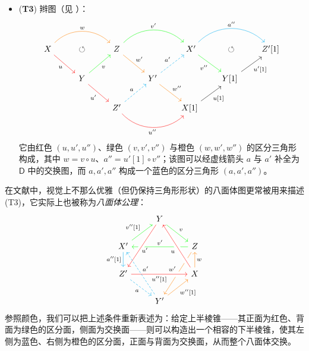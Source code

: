 \begin{Def}
\begin{itemize}[leftmargin=0.5cm]
		\item (\textbf{T3}) 辫图（见 \cite{[May01]}）：
		\begin{equation}\label{commbraid}
			\begin{tikzcd}
				X \arrow[rr, orange, bend left = 45, "w" black]\arrow[dr, red, "u"' black] & \circlearrowleft & Z\arrow[rr, green, bend left = 45, "v'" black]\arrow[dr, orange, "w'" black] & & X' \arrow[rr, cyan, bend left = 45, "a''" black]\arrow[dr, green, "v''"' black] & \circlearrowleft & \mkern-6mu Z'[1] \\
				& Y\arrow[ur, green, "v"' black]\arrow[dr, red, "u'"' black] & & Y' \arrow[ur, dashed, cyan, "a'" black]\arrow[dr, orange, "w''" black] & & \mkern-6mu Y[1]\arrow[ur, "{u'[1]}"'] \\
				& & Z'\arrow[ur, dashed, cyan, "a" black]\arrow[rr, red, bend right = 45, "u''"' black] & & \mkern-6mu X[1]\arrow[ur, "{u[1]}"']
			\end{tikzcd}
		\end{equation}
		它由红色 $(u,u',u'')$、绿色 $(v,v',v'')$ 与橙色 $(w,w',w'')$ 的区分三角形构成，其中 $w = v\circ u$、$a''= u'[1]\circ v''$；该图可以经虚线箭头 $a$ 与 $a'$ 补全为 $\mathsf{D}$ 中的交换图，而 $a,a',a''$ 构成一个蓝色的区分三角形 $(a,a',a'')$。
	\end{itemize}
\end{Def}  

在文献中，视觉上不那么优雅（但仍保持三角形形状）的八面体图更常被用来描述 (T3)，它实际上也被称为\textit{八面体公理}：
\begin{equation}\label{octahedraldiag}
	\begin{tikzcd}
		& Y\arrow[dr, green, "v" black] & \\
		X'\arrow[d, cyan, "{a''[1]}"' black]\arrow[ur, green, "{v''[1]}" black] & & Z\arrow[ll, green, "v'"' black]\arrow[ddl, orange, "w'"' black] \\
		Z'\arrow[from=uur, red, crossing over, "\!\!u'" black]\arrow[rr, red, crossing over, "{u''[1]}"' black]\arrow[dr, dashed, cyan, "a"' black] & & X\arrow[u, orange, "w"' black]\arrow[uul, red, crossing over, "\overset{}{u}" black] \\
		& Y'\arrow[ur, orange, "{w''[1]}"' black]\arrow[uul, dashed, cyan, "a'"' black] &
	\end{tikzcd}
\end{equation}
参照颜色，我们可以把上述条件重新表述为：给定上半棱锥——其正面为红色、背面为绿色的区分面，侧面为交换面——则可以构造出一个相容的下半棱锥，使其左侧为蓝色、右侧为橙色的区分面，正面与背面为交换面，从而整个八面体交换。

